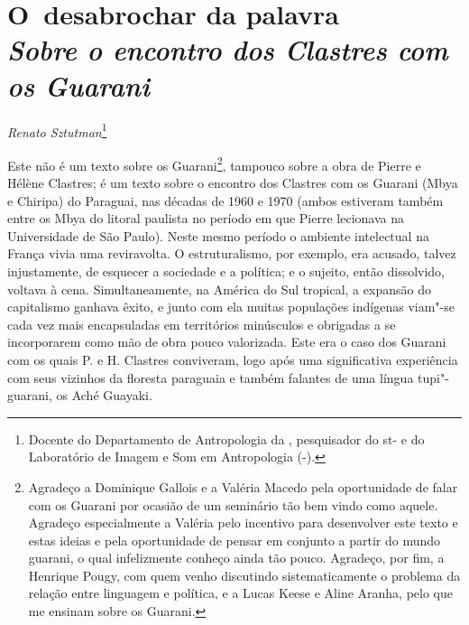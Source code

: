 \thispagestyle{empty}

\chapter*{O~desabrochar da palavra\\
\large{\emph{Sobre o encontro dos Clastres com os Guarani}}}


\begin{flushright}
\emph{Renato Sztutman}\footnote{Docente do Departamento de Antropologia da ,
pesquisador do st- e do Laboratório de Imagem e Som em
Antropologia (-).}
\end{flushright}
\medskip

\noindent Este não é um texto sobre os Guarani\footnote{Agradeço a Dominique
Gallois e a Valéria Macedo pela oportunidade de falar com os Guarani
por ocasião de um seminário tão bem vindo como aquele. Agradeço
especialmente a Valéria pelo incentivo para desenvolver este texto e
estas ideias e pela oportunidade de pensar em conjunto a partir do
mundo guarani, o qual infelizmente conheço ainda tão pouco. Agradeço,
por fim, a Henrique Pougy, com quem venho discutindo sistematicamente o
problema da relação entre linguagem e política, e a Lucas Keese e Aline
Aranha, pelo que me ensinam sobre os Guarani.}, tampouco sobre a obra
de Pierre e Hélène Clastres; é um texto sobre o encontro dos Clastres
com os Guarani (Mbya e Chiripa) do Paraguai, nas décadas de 1960 e
1970 (ambos estiveram também entre os Mbya do litoral paulista no
período em que Pierre lecionava na Universidade de São Paulo). Neste
mesmo período o ambiente intelectual na França vivia uma reviravolta. O
estruturalismo, por exemplo, era acusado, talvez injustamente, de
esquecer a sociedade e a política; e o sujeito, então dissolvido,
voltava à cena. Simultaneamente, na América do Sul tropical, a expansão
do capitalismo ganhava êxito, e junto com ela muitas populações
indígenas viam"-se cada vez mais encapsuladas em territórios minúsculos
e obrigadas a se incorporarem como mão de obra pouco valorizada. Este
era o caso dos Guarani com os quais P. e H. Clastres conviveram, logo
após uma significativa experiência com seus vizinhos da floresta
paraguaia e também falantes de uma língua tupi"-guarani, os Aché
Guayaki.

